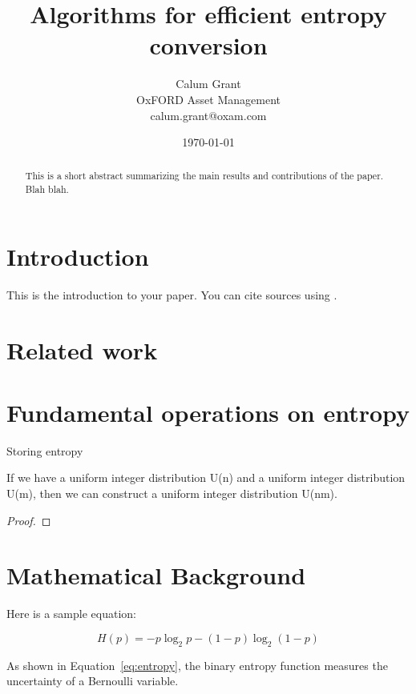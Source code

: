 \documentclass[12pt]{article}
\title{Algorithms for efficient entropy conversion}
\author{Calum Grant \\
OxFORD Asset Management \\
calum.grant@oxam.com}
\date{\today}
\begin{document}
\maketitle

\begin{abstract}
This is a short abstract summarizing the main results and contributions of the paper. Blah blah.
\end{abstract}

\section{Introduction}

This is the introduction to your paper. You can cite sources using \cite{shannon1948}.

\section{Related work}

\section{Fundamental operations on entropy}

Storing entropy

\begin{lemma}
\label{multiplication}
If we have a uniform integer distribution U(n) and a uniform integer distribution U(m), then we can
construct a uniform integer distribution U(nm).
\end{lemma}

\begin{proof}
\end{proof}

\section{}

\section{Mathematical Background}

Here is a sample equation:

\begin{equation}
H(p) = -p \log_2 p - (1 - p) \log_2(1 - p)
\label{eq:entropy}
\end{equation}

As shown in Equation~\ref{eq:entropy}, the binary entropy function measures the uncertainty of a Bernoulli variable.
\end{document}
